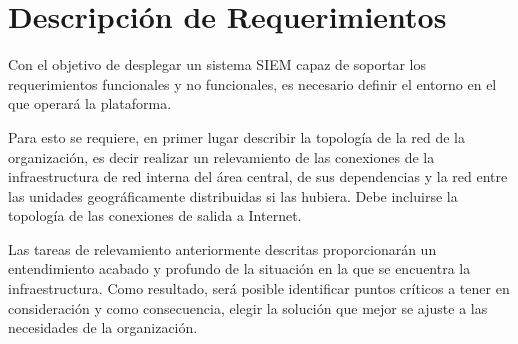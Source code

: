 \chapter{Descripción de Requerimientos}
    Con el objetivo de desplegar un sistema SIEM capaz de soportar los requerimientos funcionales y no funcionales, es necesario definir el entorno en el que operará la plataforma. \par
    Para esto se requiere, en primer lugar describir la topología de la red de la organización, es decir realizar un relevamiento de las conexiones  de la infraestructura de red interna del área central, de sus dependencias y la red entre las unidades geográficamente distribuidas si las hubiera. Debe incluirse la topología de las conexiones de salida a Internet. \par
    Las tareas de relevamiento anteriormente descritas proporcionarán un entendimiento acabado y profundo de la situación en la que se encuentra la infraestructura. Como resultado, será posible identificar puntos críticos a tener en consideración y como consecuencia, elegir la solución que mejor se ajuste a las necesidades de la organización. \par

